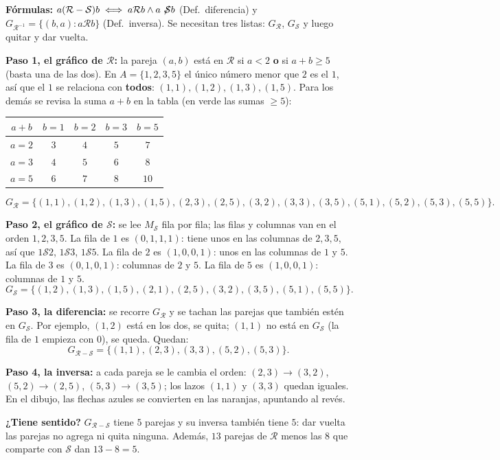 \documentclass[11pt]{article}
\newcommand{\Rr}{\mathcal{R}}
\newcommand{\Ss}{\mathcal{S}}
\begin{document}
\begin{explica}
\textbf{Fórmulas:} $a(\Rr-\Ss)b\iff a\Rr b\wedge a\not\!\Ss b$ (Def.\ diferencia) y $G_{\Rr^{-1}}=\{(b,a): a\Rr b\}$ (Def.\ inversa). Se necesitan tres listas: $G_\Rr$, $G_\Ss$ y luego quitar y dar vuelta.

\textbf{Paso 1, el gráfico de $\Rr$:} la pareja $(a,b)$ está en $\Rr$ si $a<2$ \textbf{o} si $a+b\ge5$ (basta una de las dos). En $A=\{1,2,3,5\}$ el único número menor que $2$ es el $1$, así que el $1$ se relaciona con \textbf{todos}: $(1,1),(1,2),(1,3),(1,5)$. Para los demás se revisa la suma $a+b$ en la tabla (en verde las sumas $\ge5$):
\begin{center}
\renewcommand{\arraystretch}{1.25}
\begin{tabular}{c|cccc}
$a+b$ & $b=1$ & $b=2$ & $b=3$ & $b=5$\\\hline
$a=2$ & $3$ & $4$ & \colorbox{green!35}{$5$} & \colorbox{green!35}{$7$}\\
$a=3$ & $4$ & \colorbox{green!35}{$5$} & \colorbox{green!35}{$6$} & \colorbox{green!35}{$8$}\\
$a=5$ & \colorbox{green!35}{$6$} & \colorbox{green!35}{$7$} & \colorbox{green!35}{$8$} & \colorbox{green!35}{$10$}
\end{tabular}
\end{center}
\[ G_\Rr=\{(1,1),(1,2),(1,3),(1,5),(2,3),(2,5),(3,2),(3,3),(3,5),(5,1),(5,2),(5,3),(5,5)\}. \]

\textbf{Paso 2, el gráfico de $\Ss$:} se lee $M_\Ss$ fila por fila; las filas y columnas van en el orden $1,2,3,5$. La fila de $1$ es $(0,1,1,1)$: tiene unos en las columnas de $2,3,5$, así que $1\Ss2$, $1\Ss3$, $1\Ss5$. La fila de $2$ es $(1,0,0,1)$: unos en las columnas de $1$ y $5$. La fila de $3$ es $(0,1,0,1)$: columnas de $2$ y $5$. La fila de $5$ es $(1,0,0,1)$: columnas de $1$ y $5$.
\[ G_\Ss=\{(1,2),(1,3),(1,5),(2,1),(2,5),(3,2),(3,5),(5,1),(5,5)\}. \]

\textbf{Paso 3, la diferencia:} se recorre $G_\Rr$ y se tachan las parejas que también estén en $G_\Ss$. Por ejemplo, $(1,2)$ está en los dos, se quita; $(1,1)$ no está en $G_\Ss$ (la fila de $1$ empieza con $0$), se queda. Quedan:
\[ G_{\Rr-\Ss}=\{(1,1),(2,3),(3,3),(5,2),(5,3)\}. \]

\textbf{Paso 4, la inversa:} a cada pareja se le cambia el orden: $(2,3)\to(3,2)$, $(5,2)\to(2,5)$, $(5,3)\to(3,5)$; los lazos $(1,1)$ y $(3,3)$ quedan iguales. En el dibujo, las flechas azules se convierten en las naranjas, apuntando al revés.

\textbf{¿Tiene sentido?} $G_{\Rr-\Ss}$ tiene $5$ parejas y su inversa también tiene $5$: dar vuelta las parejas no agrega ni quita ninguna. Además, $13$ parejas de $\Rr$ menos las $8$ que comparte con $\Ss$ dan $13-8=5$.
\end{explica}
\end{document}
